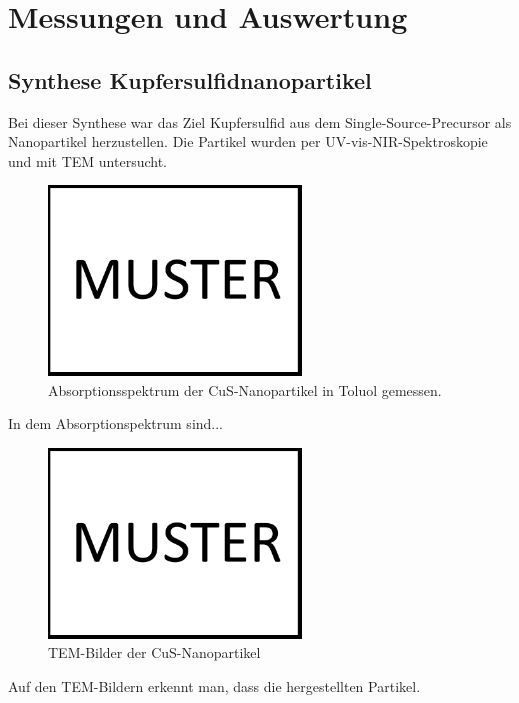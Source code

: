 \section{Messungen und Auswertung}

\subsection{Synthese Kupfersulfidnanopartikel}
	Bei dieser Synthese war das Ziel Kupfersulfid aus dem Single-Source-Precursor  als Nanopartikel herzustellen. 
	Die Partikel wurden per UV-vis-NIR-Spektroskopie und mit TEM untersucht.
	
	\begin{figure}[H]
		\centering
		\includegraphics[width=0.6\textwidth]{Bilder/Muster} 	
		\caption{Absorptionsspektrum der CuS-Nanopartikel in Toluol gemessen.}
		\label{fig:UV-CuS}
	\end{figure}

	In dem Absorptionspektrum sind... 
	
	\begin{figure}[H]
		\centering
		\includegraphics[width=0.6\textwidth]{Bilder/MUSTER} 	
		\caption{TEM-Bilder der CuS-Nanopartikel}
		\label{fig:TEM-CuS}
	\end{figure}

	Auf den TEM-Bildern erkennt man, dass die hergestellten Partikel. 
	
